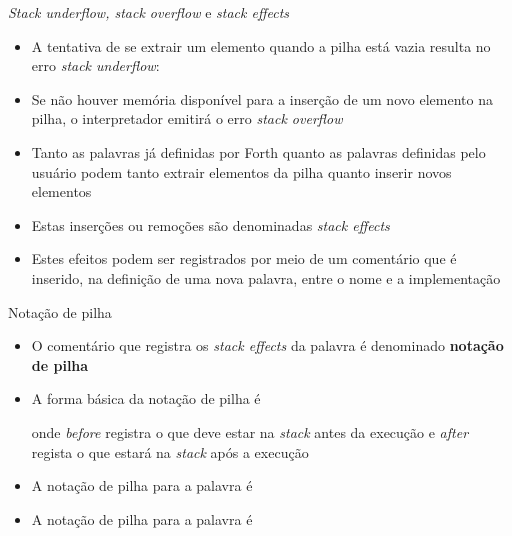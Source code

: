 \begin{frame}[fragile]{\textit{Stack underflow, stack overflow} e \textit{stack effects}}

    \begin{itemize}
        \item A tentativa de se extrair um elemento quando a pilha está vazia resulta no erro
            \textit{stack underflow}:

            \vspace{0.1in}

        \item Se não houver memória disponível para a inserção de um novo elemento na pilha, o 
            interpretador emitirá o erro \textit{stack overflow}

        \item Tanto as palavras já definidas por Forth quanto as palavras definidas pelo usuário
            podem tanto extrair elementos da pilha quanto inserir novos elementos

        \item Estas inserções ou remoções são denominadas \textit{stack effects}

        \item Estes efeitos podem ser registrados por meio de um comentário que é inserido, na 
            definição de uma nova palavra, entre o nome e a implementação
    \end{itemize}

\end{frame}

\begin{frame}[fragile]{Notação de pilha}

    \begin{itemize}
        \item O comentário que registra os  \textit{stack effects} da palavra é denominado
            \textbf{notação de pilha}

        \item A forma básica da notação de pilha é


        onde \textit{before} registra o que deve estar na \textit{stack} antes da execução e
        \textit{after} regista o que estará na \textit{stack} após a execução

        \item A notação de pilha para a palavra  é 


        \item A notação de pilha para a palavra  é 


    \end{itemize}

\end{frame}

